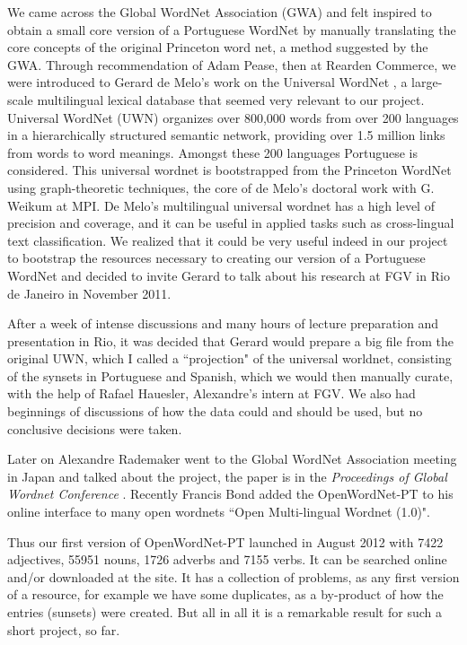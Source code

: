 We came across the Global WordNet Association (GWA) and felt inspired
to obtain a small core version of a Portuguese WordNet by manually
translating the core concepts of the original Princeton word net, a
method suggested by the GWA. Through recommendation of Adam Pease,
then at Rearden Commerce, we were introduced to Gerard de Melo's work
on the Universal WordNet \cite{}, a large-scale multilingual lexical
database that seemed very relevant to our project. Universal WordNet
(UWN) organizes over 800,000 words from over 200 languages in a
hierarchically structured semantic network, providing over 1.5 million
links from words to word meanings. Amongst these 200 languages
Portuguese is considered. This universal wordnet is bootstrapped from
the Princeton WordNet using graph-theoretic techniques, the core of de
Melo's doctoral work with G. Weikum at MPI. De Melo's multilingual
universal wordnet has a high level of precision and coverage, and it
can be useful in applied tasks such as cross-lingual text
classification. We realized that it could be very useful indeed in our
project to bootstrap the resources necessary to creating our version
of a Portuguese WordNet and decided to invite Gerard to talk about his
research at FGV in Rio de Janeiro in November 2011.

After a week of intense discussions and many hours of lecture
preparation and presentation in Rio, it was decided that Gerard would
prepare a big file from the original UWN, which I called a
``projection" of the universal worldnet, consisting of the synsets in
Portuguese and Spanish, which we would then manually curate, with the
help of Rafael Hauesler, Alexandre's intern at FGV. We also had
beginnings of discussions of how the data could and should be used,
but no conclusive decisions were taken.

Later on Alexandre Rademaker went to the Global WordNet Association
meeting in Japan and talked about the project, the paper is in the
{\it Proceedings of Global Wordnet Conference} \cite{}.  Recently
Francis Bond added the OpenWordNet-PT to his online interface to many
open wordnets ``Open Multi-lingual Wordnet (1.0)".

Thus our first version of OpenWordNet-PT launched in August 2012 with
7422 adjectives, 55951 nouns, 1726 adverbs and 7155 verbs. It can be
searched online and/or downloaded at the site. It has a collection of
problems, as any first version of a resource, for example we have some
duplicates, as a by-product of how the entries (sunsets) were
created. But all in all it is a remarkable result for such a short
project, so far.

